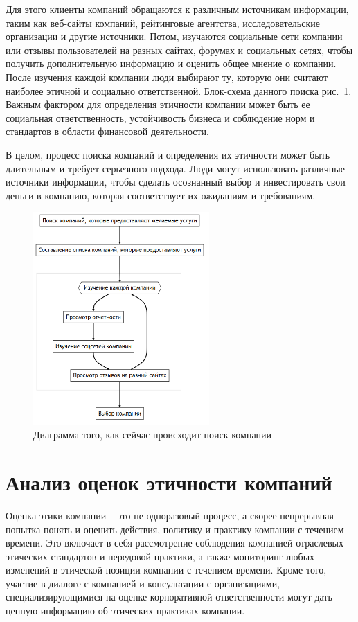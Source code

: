 \documentclass[PI, VKR]{HSEUniversity}
\begin{document}
Для этого клиенты компаний обращаются к различным источникам информации, таким как веб-сайты компаний, рейтинговые агентства, исследовательские организации и другие источники. Потом, изучаются социальные сети компании или отзывы пользователей на разных сайтах, форумах и социальных сетях, чтобы получить дополнительную информацию и оценить общее мнение о компании. После изучения каждой компании люди выбирают ту, которую они считают наиболее этичной и социально ответственной. Блок-схема данного поиска рис.~\ref{fig:as_is}. Важным фактором для определения этичности компании может быть ее социальная ответственность, устойчивость бизнеса и соблюдение норм и стандартов в области финансовой деятельности.

В целом, процесс поиска компаний и определения их этичности может быть длительным и требует серьезного подхода. Люди могут использовать различные источники информации, чтобы сделать осознанный выбор и инвестировать свои деньги в компанию, которая соответствует их ожиданиям и требованиям.
\begin{figure}[h]
\centering
\includegraphics[width=0.6\textwidth]{img/mermaid/as_is.png}
\caption{\label{fig:as_is}Диаграмма того, как сейчас происходит поиск компании}
\end{figure}

\section{Анализ оценок этичности компаний}
\label{sec:org2509a22}
Оценка этики компании -- это не одноразовый процесс, а скорее непрерывная попытка понять и оценить действия, политику и практику компании с течением времени. Это включает в себя рассмотрение соблюдения компанией отраслевых этических стандартов и передовой практики, а также мониторинг любых изменений в этической позиции компании с течением времени. Кроме того, участие в диалоге с компанией и консультации с организациями, специализирующимися на оценке корпоративной ответственности могут дать ценную информацию об этических практиках компании.
\end{document}
